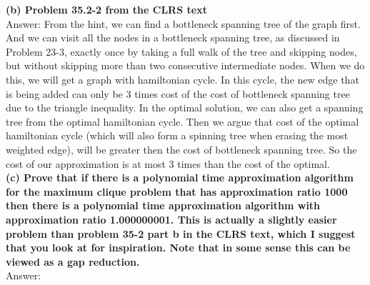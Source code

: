\documentclass{article}
\begin{document}
\textbf{(b) Problem 35.2-2 from the CLRS text} \\ \newline
Answer: From the hint, we can find a bottleneck spanning tree of the graph first. And we can visit all the nodes in a bottleneck spanning tree, as discussed in Problem 23-3, exactly once by taking a full walk of the tree and skipping nodes, but without skipping more than two consecutive intermediate nodes. When we do this, we will get a graph with hamiltonian cycle. In this cycle, the new edge that is being added can only be 3 times cost of the cost of bottleneck spanning tree due to the triangle inequality. In the optimal solution, we can also get a spanning tree from the optimal hamiltonian cycle. Then we argue that cost of the optimal hamiltonian cycle (which will also form a spinning tree when erasing the most weighted edge), will be greater then the cost of bottleneck spanning tree. So the cost of our approximation is at most 3 times than the cost of the optimal.\\ \newline
\textbf{(c) Prove that if there is a polynomial time approximation algorithm for the maximum clique problem that has approximation ratio 1000 then there is a polynomial time approximation algorithm with approximation ratio 1.000000001. This is actually a slightly easier problem than problem 35-2 part b in the CLRS text, which I suggest that you look at for inspiration. Note that in some sense this can be viewed as a gap reduction.}\\ \newline
Answer: 
\end{document}

